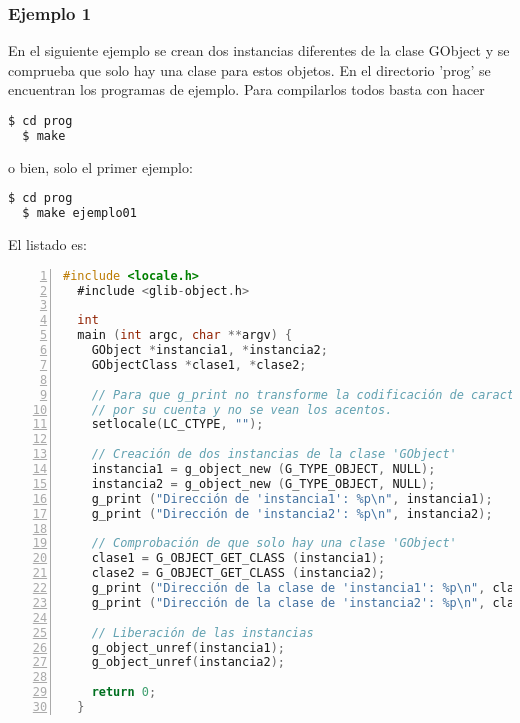 \subsubsection{Ejemplo 1}
En el siguiente ejemplo se crean dos instancias diferentes de la clase \textsf{GObject} y se comprueba que
solo hay una clase para estos objetos. En el directorio 'prog' se encuentran los programas de ejemplo.
Para compilarlos todos basta con hacer
\begin{lstlisting}[language=bash]
  $ cd prog
  $ make
\end{lstlisting}
o bien, solo el primer ejemplo:
\begin{lstlisting}[language=bash]
  $ cd prog
  $ make ejemplo01
\end{lstlisting}

El listado es:
\begin{lstlisting}[language=C, numbers=left]
  #include <locale.h>
  #include <glib-object.h>

  int
  main (int argc, char **argv) {
    GObject *instancia1, *instancia2;
    GObjectClass *clase1, *clase2;

    // Para que g_print no transforme la codificación de caracteres
    // por su cuenta y no se vean los acentos.
    setlocale(LC_CTYPE, "");

    // Creación de dos instancias de la clase 'GObject'
    instancia1 = g_object_new (G_TYPE_OBJECT, NULL);
    instancia2 = g_object_new (G_TYPE_OBJECT, NULL);
    g_print ("Dirección de 'instancia1': %p\n", instancia1);
    g_print ("Dirección de 'instancia2': %p\n", instancia2);

    // Comprobación de que solo hay una clase 'GObject'
    clase1 = G_OBJECT_GET_CLASS (instancia1);
    clase2 = G_OBJECT_GET_CLASS (instancia2);
    g_print ("Dirección de la clase de 'instancia1': %p\n", clase1);
    g_print ("Dirección de la clase de 'instancia2': %p\n", clase2);

    // Liberación de las instancias
    g_object_unref(instancia1);
    g_object_unref(instancia2);

    return 0;
  }
\end{lstlisting}

